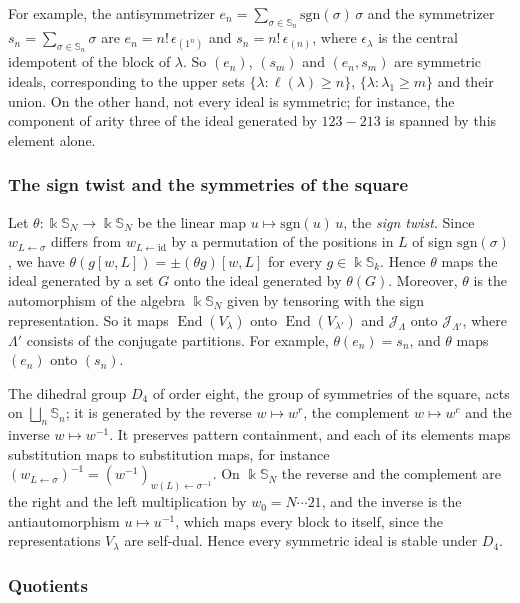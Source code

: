 \documentclass[11pt]{amsart}
\theoremstyle{definition}
\theoremstyle{remark}
\newcommand{\bS}{\mathbb{S}}
\newcommand{\kk}{\Bbbk}
\newcommand{\sgn}{\mathrm{sgn}}
\newcommand{\cJ}{\mathscr{J}}
\newcommand{\id}{\mathrm{id}}
\newcommand{\End}{\operatorname{End}}
\begin{document}
For example, the antisymmetrizer $e_n=\sum_{\sigma\in\bS_n}\sgn(\sigma)\,\sigma$ and the symmetrizer $s_n=\sum_{\sigma\in\bS_n}\sigma$ are $e_n=n!\,\epsilon_{(1^n)}$ and $s_n=n!\,\epsilon_{(n)}$, where $\epsilon_\lambda$ is the central idempotent of the block of $\lambda$. So $(e_n)$, $(s_m)$ and $(e_n,s_m)$ are symmetric ideals, corresponding to the upper sets $\{\lambda:\ell(\lambda)\ge n\}$, $\{\lambda:\lambda_1\ge m\}$ and their union. On the other hand, not every ideal is symmetric; for instance, the component of arity three of the ideal generated by $123-213$ is spanned by this element alone.

\subsubsection{The sign twist and the symmetries of the square}
Let $\theta\colon\kk\bS_N\to\kk\bS_N$ be the linear map $u\mapsto\sgn(u)\,u$, the \emph{sign twist}. Since $w_{L\leftarrow\sigma}$ differs from $w_{L\leftarrow\id}$ by a permutation of the positions in $L$ of sign $\sgn(\sigma)$, we have $\theta(g[w,L])=\pm(\theta g)[w,L]$ for every $g\in\kk\bS_k$. Hence $\theta$ maps the ideal generated by a set $G$ onto the ideal generated by $\theta(G)$. Moreover, $\theta$ is the automorphism of the algebra $\kk\bS_N$ given by tensoring with the sign representation. So it maps $\End(V_\lambda)$ onto $\End(V_{\lambda'})$ and $\cJ_\Lambda$ onto $\cJ_{\Lambda'}$, where $\Lambda'$ consists of the conjugate partitions. For example, $\theta(e_n)=s_n$, and $\theta$ maps $(e_n)$ onto $(s_n)$.

The dihedral group $D_4$ of order eight, the group of symmetries of the square, acts on $\bigsqcup_n\bS_n$; it is generated by the reverse $w\mapsto w^r$, the complement $w\mapsto w^c$ and the inverse $w\mapsto w^{-1}$. It preserves pattern containment, and each of its elements maps substitution maps to substitution maps, for instance $(w_{L\leftarrow\sigma})^{-1}=(w^{-1})_{w(L)\leftarrow\sigma^{-1}}$. On $\kk\bS_N$ the reverse and the complement are the right and the left multiplication by $w_0=N\cdots21$, and the inverse is the antiautomorphism $u\mapsto u^{-1}$, which maps every block to itself, since the representations $V_\lambda$ are self-dual. Hence every symmetric ideal is stable under $D_4$.

\subsubsection{Quotients}
\end{document}
